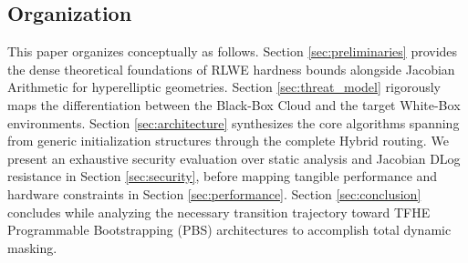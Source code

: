 \subsection{Organization}
This paper organizes conceptually as follows. Section \ref{sec:preliminaries} provides the dense theoretical foundations of RLWE hardness bounds alongside Jacobian Arithmetic for hyperelliptic geometries. Section \ref{sec:threat_model} rigorously maps the differentiation between the Black-Box Cloud and the target White-Box environments. Section \ref{sec:architecture} synthesizes the core algorithms spanning from generic initialization structures through the complete Hybrid routing. We present an exhaustive security evaluation over static analysis and Jacobian DLog resistance in Section \ref{sec:security}, before mapping tangible performance and hardware constraints in Section \ref{sec:performance}. Section \ref{sec:conclusion} concludes while analyzing the necessary transition trajectory toward TFHE Programmable Bootstrapping (PBS) architectures to accomplish total dynamic masking.
